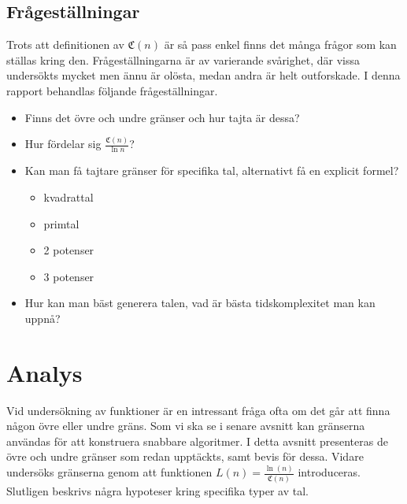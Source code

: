 \documentclass[a4paper,titlepage]{article}
\newcommand{\C}[1]{\mathfrak C \left( #1 \right)}
\theoremstyle{definition}
\begin{document}
    \subsection{Frågeställningar}
            Trots att definitionen av $\C{n}$ är så pass enkel finns det många
            frågor som kan ställas kring den. Frågeställningarna är av
            varierande svårighet, där vissa undersökts mycket men ännu är olösta, medan
            andra är helt outforskade.
             I denna rapport behandlas följande frågeställningar.
            \begin{itemize}
            \item Finns det övre och undre gränser och hur tajta är dessa?
            \item Hur fördelar sig $\frac{\C{n}}{\ln{n}}$?
            \item Kan man få tajtare gränser för specifika tal, alternativt få
                en explicit formel?
                \begin{itemize}
                    \item kvadrattal
                    \item primtal
                    \item 2 potenser
                    \item 3 potenser

                \end{itemize}
            \item Hur kan man bäst generera talen, vad är bästa tidskomplexitet
                man kan uppnå?
        \end{itemize}


\section{Analys}
    Vid undersökning av funktioner är en intressant fråga ofta om det går att finna någon övre eller undre gräns.
    Som vi ska se i senare avsnitt kan gränserna användas för att konstruera snabbare algoritmer. 
    I detta avsnitt presenteras de övre och undre gränser som redan upptäckts,
    samt bevis för dessa. Vidare undersöks gränserna genom att funktionen $ L(n) = \frac{\ln(n)}{\C{n}}$ introduceras.
    Slutligen beskrivs några hypoteser kring specifika typer av tal. 
\end{document}
